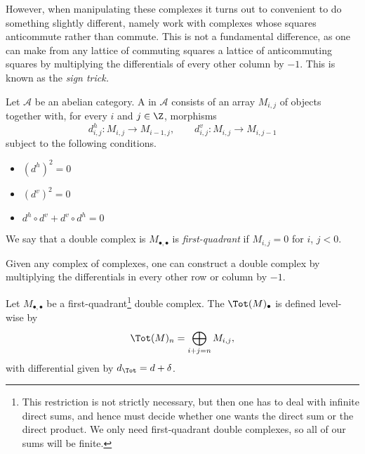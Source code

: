 \documentclass[main.tex]{subfiles}
\begin{document}
However, when manipulating these complexes it turns out to convenient to do something slightly different, namely work with complexes whose squares anticommute rather than commute. This is not a fundamental difference, as one can make from any lattice of commuting squares a lattice of anticommuting squares by multiplying the differentials of every other column by $-1$. This is known as the \emph{sign trick.}

\begin{definition}
  \label{def:double_complex}
  Let $\mathcal{A}$ be an abelian category. A  in $\mathcal{A}$ consists of an array $M_{i,j}$ of objects together with, for every $i$ and $j \in \Z$, morphisms
  \begin{equation*}
    d^{h}_{i,j}\colon M_{i,j} \to M_{i-1,j},\qquad d^{v}_{i,j}\colon M_{i,j} \to M_{i, j-1}
  \end{equation*}
  subject to the following conditions.
  \begin{itemize}
    \item $(d^{h})^{2} = 0$

    \item $(d^{v})^{2} = 0$

    \item $d^{h} \circ d^{v} + d^{v} \circ d^{h} = 0$
  \end{itemize}

\end{definition}

We say that a double complex is $M_{\bullet,\bullet}$ is \emph{first-quadrant} if $M_{i,j} = 0$ for $i$, $j < 0$.

Given any complex of complexes, one can construct a double complex by multiplying the differentials in every other row or column by $-1$.

\begin{definition}
  \label{def:total_complex}
  Let $M_{\bullet, \bullet}$ be a first-quadrant\footnote{This restriction is not strictly necessary, but then one has to deal with infinite direct sums, and hence must decide whether one wants the direct sum or the direct product. We only need first-quadrant double complexes, so all of our sums will be finite.} double complex. The  $\Tot(M)_{\bullet}$ is defined level-wise by
  \begin{equation*}
    \Tot(M)_{n}  = \bigoplus_{i + j = n} M_{i,j},
  \end{equation*}
  with differential given by $d_{\Tot} = d + \delta$.
\end{definition}
\end{document}
